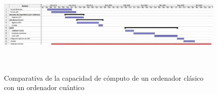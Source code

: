 \begin{figure}[h]
	\centering
	\includegraphics[width=15cm,height=5cm]{figuras/Gantt_ini.jpg}
	\caption{Comparativa de la capacidad de cómputo de un ordenador clásico con un ordenador cuántico\cite{clasica-vs-cuantica}}
	\label{fig:comp-clasica-cuantica}
\end{figure}
